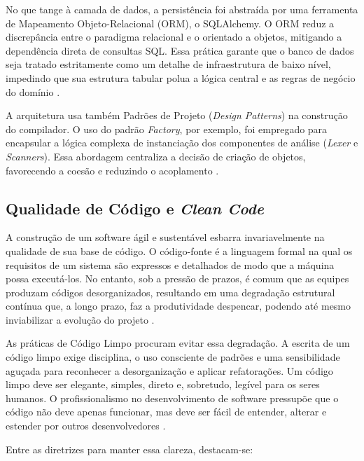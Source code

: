No que tange à camada de dados, a persistência foi abstraída por uma ferramenta de Mapeamento Objeto-Relacional (ORM), o SQLAlchemy. O ORM reduz a discrepância entre o paradigma relacional e o orientado a objetos, mitigando a dependência direta de consultas SQL. Essa prática garante que o banco de dados seja tratado estritamente como um detalhe de infraestrutura de baixo nível, impedindo que sua estrutura tabular polua a lógica central e as regras de negócio do domínio \cite{martin_clean,silveira2012}.

A arquitetura usa também Padrões de Projeto (\textit{Design Patterns}) na construção do compilador. O uso do padrão \textit{Factory}, por exemplo, foi empregado para encapsular a lógica complexa de instanciação dos componentes de análise (\textit{Lexer} e \textit{Scanners}). Essa abordagem centraliza a decisão de criação de objetos, favorecendo a coesão e reduzindo o acoplamento \cite{silveira2012}.

\subsection{Qualidade de Código e \textit{Clean Code}}

A construção de um software ágil e sustentável esbarra invariavelmente na qualidade de sua base de código. O código-fonte é a linguagem formal na qual os requisitos de um sistema são expressos e detalhados de modo que a máquina possa executá-los. No entanto, sob a pressão de prazos, é comum que as equipes produzam códigos desorganizados, resultando em uma degradação estrutural contínua que, a longo prazo, faz a produtividade despencar, podendo até mesmo inviabilizar a evolução do projeto \cite{martin_clean_code}.

As práticas de Código Limpo procuram evitar essa degradação. A escrita de um código limpo exige disciplina, o uso consciente de padrões e uma sensibilidade aguçada para reconhecer a desorganização e aplicar refatorações. Um código limpo deve ser elegante, simples, direto e, sobretudo, legível para os seres humanos. O profissionalismo no desenvolvimento de software pressupõe que o código não deve apenas funcionar, mas deve ser fácil de entender, alterar e estender por outros desenvolvedores \cite{martin_clean_code}.

Entre as diretrizes para manter essa clareza, destacam-se:

